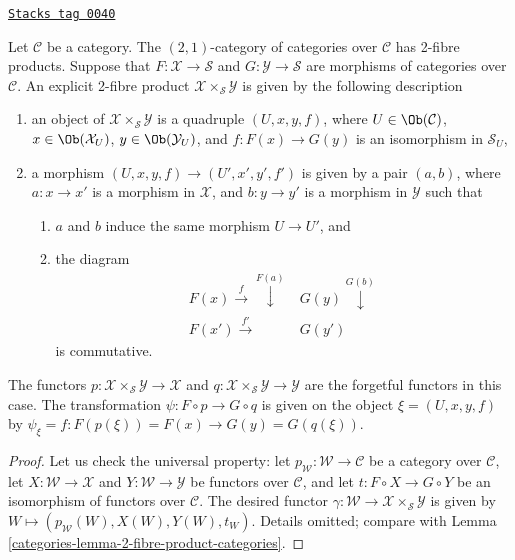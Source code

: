 \begin{lemma}
\label{categories-lemma-2-product-categories-over-C}
\href{https://stacks.math.columbia.edu/tag/0040}{\texttt{Stacks tag 0040}}

Let $\mathcal{C}$ be a category.
The $(2, 1)$-category of categories
over $\mathcal{C}$ has 2-fibre products.
Suppose that
$F : \mathcal{X} \to \mathcal{S}$ and
$G : \mathcal{Y} \to \mathcal{S}$ are morphisms of categories over
$\mathcal{C}$.
An explicit 2-fibre product
$\mathcal{X} \times_\mathcal{S}\mathcal{Y}$ is given by the following
description
\begin{enumerate}
\item an object of $\mathcal{X} \times_\mathcal{S} \mathcal{Y}$ is a quadruple
$(U, x, y, f)$, where $U \in \Ob(\mathcal{C})$,
$x\in \Ob(\mathcal{X}_U)$, $y\in \Ob(\mathcal{Y}_U)$,
and $f : F(x) \to G(y)$ is an isomorphism in $\mathcal{S}_U$,
\item a morphism $(U, x, y, f) \to (U', x', y', f')$ is given by a pair
$(a, b)$, where $a : x \to x'$ is a morphism in $\mathcal{X}$, and
$b : y \to y'$ is a
morphism in $\mathcal{Y}$ such that
\begin{enumerate}
\item $a$ and $b$ induce the same morphism $U \to U'$, and
\item the diagram
$$
\begin{array}{cc}F(x) \overset{f}{\longrightarrow}\overset{F(a)}{\downarrow} & G(y) \overset{G(b)}{\downarrow} \\ F(x') \overset{f'}{\longrightarrow} & G(y')\end{array}
$$
is commutative.
\end{enumerate}
\end{enumerate}
The functors $p : \mathcal{X} \times_\mathcal{S}\mathcal{Y} \to \mathcal{X}$
and $q : \mathcal{X} \times_\mathcal{S}\mathcal{Y} \to \mathcal{Y}$ are the
forgetful functors in this case. The transformation $\psi : F \circ p \to
G \circ q$ is given on the object $\xi = (U, x, y, f)$ by
$\psi_\xi = f : F(p(\xi)) = F(x) \to G(y) = G(q(\xi))$.
\end{lemma}

\begin{proof}

Let us check the universal property: let
$p_\mathcal{W} : \mathcal{W}\to \mathcal{C}$
be a category over $\mathcal{C}$, let $X : \mathcal{W} \to \mathcal{X}$ and
$Y : \mathcal{W} \to \mathcal{Y}$ be functors over $\mathcal{C}$, and let
$t : F \circ X \to G \circ Y$ be an isomorphism of functors over $\mathcal{C}$.
The desired functor
$\gamma : \mathcal{W} \to \mathcal{X} \times_\mathcal{S} \mathcal{Y}$
is given by $W \mapsto (p_\mathcal{W}(W), X(W), Y(W), t_W)$.
Details omitted; compare with Lemma \ref{categories-lemma-2-fibre-product-categories}.
\end{proof}

